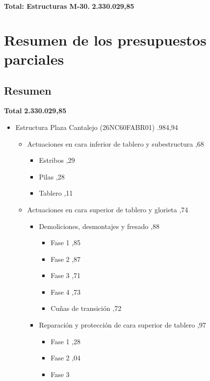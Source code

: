 %
\noindent%
\large%
\textbf{Total: Estructuras M{-}30. }%
\dotfill%
\textbf{2.330.029,85}%
\newline%
\normalsize

%
\part{Resumen de los presupuestos parciales}%
\label{sec:Resumendelospresupuestosparciales}%
\chapter*{Resumen}%
\label{sec:Resumen}%
\Large%
\textbf{Total}%
\dotfill%
\textbf{2.330.029,85}%
\normalsize%
\begin{itemize}%
\item%
Estructura Plaza Cantalejo (26NC60FABR01)%
.984,94%
\begin{itemize}%
\item%
Actuaciones en cara inferior de tablero y subestructura%
,68%
\begin{itemize}%
\item%
Estribos%
,29%
\item%
Pilas%
,28%
\item%
Tablero%
,11%
\end{itemize}%
\item%
Actuaciones en cara superior de tablero y glorieta%
,74%
\begin{itemize}%
\item%
Demoliciones, desmontajes y fresado%
,88%
\begin{itemize}%
\item%
Fase 1%
,85%
\item%
Fase 2%
,87%
\item%
Fase 3%
,71%
\item%
Fase 4%
,73%
\item%
Cuñas de transición%
,72%
\end{itemize}%
\item%
Reparación y protección de cara superior de tablero%
,97%
\begin{itemize}%
\item%
Fase 1%
,28%
\item%
Fase 2%
,04%
\item%
Fase 3%
\dotfill%

\end{itemize}
\end{itemize}
\end{itemize}
\end{itemize}
